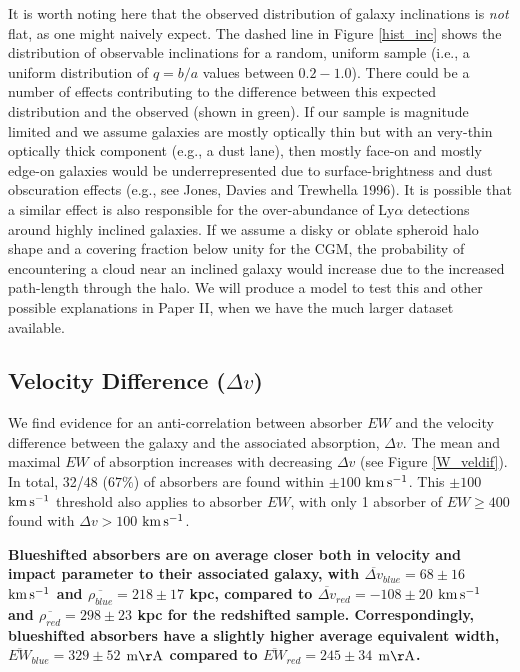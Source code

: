 \documentclass[twocolumn,tighten]{aastex6}
\begin{document}
It is worth noting here that the observed distribution of galaxy inclinations is \emph{not} flat, as one might naively expect. The dashed line in Figure \ref{hist_inc} shows the distribution of observable inclinations for a random, uniform sample (i.e., a uniform distribution of $q=b/a$ values between $0.2 - 1.0$). There could be a number of effects contributing to the difference between this expected distribution and the observed (shown in green). If our sample is magnitude limited and we assume galaxies are mostly optically thin but with an very-thin optically thick component (e.g., a dust lane), then mostly face-on and mostly edge-on galaxies would be underrepresented due to surface-brightness and dust obscuration effects (e.g., see Jones, Davies and Trewhella 1996). It is possible that a similar effect is also responsible for the over-abundance of Ly$\alpha$ detections around highly inclined galaxies. If we assume a disky or oblate spheroid halo shape and a covering fraction below unity for the CGM, the probability of encountering a cloud near an inclined galaxy would increase due to the increased path-length through the halo. We will produce a model to test this and other possible explanations in Paper II, when we have the much larger dataset available.

\vspace{10pt}


\subsection{Velocity Difference \rm($\Delta v$\rm)}
\label{veldiff}

We find evidence for an anti-correlation between absorber $EW$ and the velocity difference between the galaxy and the associated absorption, $\Delta v$. The mean and maximal $EW$ of absorption increases with decreasing $\Delta v$ (see Figure \ref{W_veldif}). In total, 32/48 ($67\%$) of absorbers are found within $\pm100$ $\rm km\, s^{-1}$. This $\pm100$ $\rm km\, s^{-1}$ threshold also applies to absorber $EW$, with only 1 absorber of $EW \geq 400$ found with $\Delta v > 100$ $\rm km\, s^{-1}$. 

\textbf{Blueshifted absorbers are on average closer both in velocity and impact parameter to their associated galaxy, with $\overline{\Delta v}_{blue} = 68\pm16$ $\rm km\, s^{-1}$ and $\overline{\rho_{blue}} = 218\pm17$ kpc,  compared to $\overline{\Delta v}_{red}=-108\pm20$ $\rm km\, s^{-1}$ and $\overline{\rho_{red}} = 298\pm23$ kpc for the redshifted sample. Correspondingly, blueshifted absorbers have a slightly higher average equivalent width, $\overline{EW}_{blue}=329\pm52$ $\rm m\AA$ compared to $\overline{EW}_{red}=245\pm34$ $\rm m\AA$.}
\end{document}
